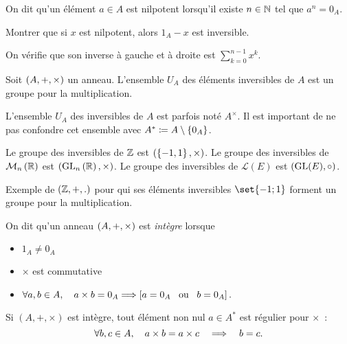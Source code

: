 \documentclass{magnolia}
\begin{document}
\begin{definition}
On dit qu'un élément $a\in A$ est nilpotent lorsqu'il existe $n\in\mathbb{N}$ tel que $a^n=0_A$.
\end{definition}

\begin{exoUnique}
\exo Montrer que si $x$ est nilpotent, alors $1_A-x$ est inversible.
\end{exoUnique}
\begin{sol}
On vérifie que son inverse à gauche et à droite est $\displaystyle\sum_{k=0}^{n-1}x^k$.
\end{sol}

\begin{definition}
Soit $\left(A,+,\times\right)$ un anneau. L'ensemble $U_A$ des éléments inversibles de $A$
est un groupe pour la multiplication.
\end{definition}

\begin{remarqueUnique}
\remarque L'ensemble $U_A$ des inversibles de $A$ est parfois noté $A^\times$. Il est important de ne pas
  confondre cet ensemble avec $A^*\coloneqq A\setminus\left\{0_A\right\}$.
\end{remarqueUnique}

\begin{exemples}
\exemple Le groupe des inversibles de $\mathbb{Z}$ est $(\left\{-1,1\right\},\times)$.
\exemple Le groupe des inversibles de $\mathcal{M}_{n}\left(\mathbb{R}\right)$ est $({\rm GL}_{n}\left(\mathbb{R}\right),\times)$. Le
  groupe des inversibles de $\mathcal{L}(E)$ est $({\rm GL}(E),\circ)$.
\end{exemples}

\begin{sol}
Exemple de $(\mathbb{Z},+,.)$ pour qui ses éléments inversibles $\set{-1;1}$ forment un groupe pour la multiplication.
\end{sol}


\begin{definition}
On dit qu'un anneau $\left(A,+,\times\right)$ est \emph{intègre} lorsque
\begin{itemize}
\item $1_A\neq 0_A$
\item $\times$ est commutative
\item $\forall a,b\in A ,\quad a\times b=0_A \Longrightarrow \left[a=0_A \quad\!\text{ou}\quad\! b=0_A\right].$
\end{itemize}
\end{definition}

\begin{remarqueUnique}
\remarque Si $(A,+,\times)$ est intègre, tout élément non nul $a\in A^*$ est régulier pour $\times$~:
    \[\forall b,c \in A,\quad a\times b=a\times c \quad\Longrightarrow\quad b=c.\]
\end{remarqueUnique}
\end{document}
